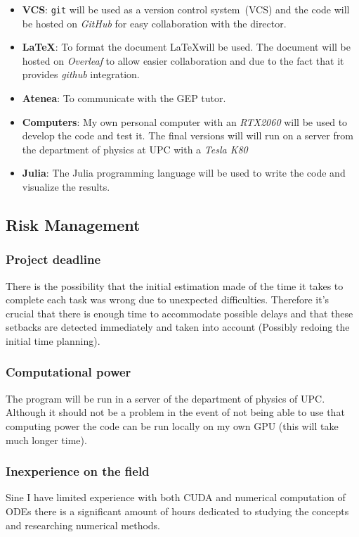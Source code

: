 \begin{itemize}
    \item \textbf{VCS}: \texttt{git} will be used as a version control
        system~(VCS) and the code will be hosted on \emph{GitHub} for easy
        collaboration with the director.
    \item \textbf{\LaTeX}: To format the document \LaTeX will be used. The
        document will be hosted on \emph{Overleaf} to allow easier collaboration
        and due to the fact that it provides \emph{github} integration.
    \item \textbf{Atenea}: To communicate with the GEP tutor.
    \item \textbf{Computers}: My own personal computer with an \emph{RTX2060} will be
        used to develop the code and test it. The final versions will will run
        on a server from the department of physics at UPC with a \emph{Tesla K80} %
    \item \textbf{Julia}: The Julia programming language will be used to write
        the code and visualize the results.
\end{itemize}



\subsection{Risk Management}


    \subsubsection{Project deadline}
    There is the possibility that the initial estimation made of the time it takes to
    complete each task was wrong due to unexpected difficulties. Therefore it's
    crucial that there is enough time to accommodate possible delays and that
    these setbacks are detected immediately and taken into account (Possibly
    redoing the initial time planning).

    \subsubsection{Computational power}
    The program will be run in a server of the department of physics of UPC.
    Although it should not be a problem in the event of not being able to use
    that computing power the code can be run locally on my own GPU (this will
    take much longer time).

    \subsubsection{Inexperience on the field}
    Sine I have limited experience with both CUDA and numerical computation of
    ODEs there is a significant amount of hours dedicated to studying the
    concepts and researching numerical methods.
